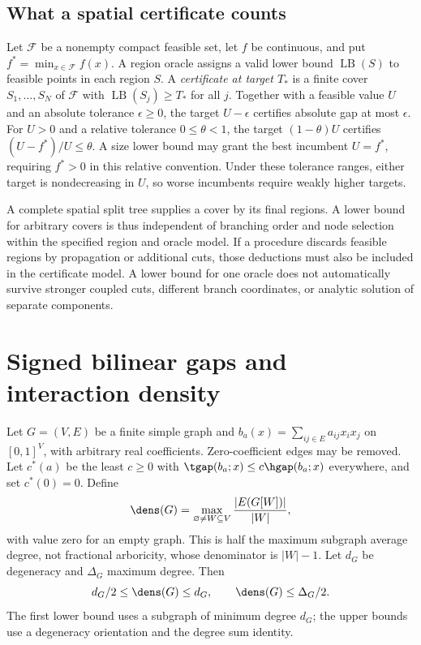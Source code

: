 \subsection{What a spatial certificate counts}\label{subsec:certificate-model}
Let $\mathcal F$ be a nonempty compact feasible set, let $f$ be continuous,
and put $f^*=\min_{x\in\mathcal F}f(x)$. A region oracle assigns a valid
lower bound $\operatorname{LB}(S)$ to feasible points in each region $S$.
A \emph{certificate at target $T_*$} is a finite cover $S_1,\ldots,S_N$
of $\mathcal F$ with $\operatorname{LB}(S_j)\ge T_*$ for all $j$.
Together with a feasible value $U$ and an absolute tolerance $\epsilon\ge0$,
the target $U-\epsilon$ certifies absolute gap at most $\epsilon$.
For $U>0$ and a relative tolerance $0\le\theta<1$, the target
$(1-\theta)U$ certifies $(U-f^*)/U\le\theta$. A size lower bound may
grant the best incumbent $U=f^*$, requiring $f^*>0$ in this relative
convention. Under these tolerance ranges, either target is nondecreasing
in $U$, so worse incumbents require weakly higher targets.

A complete spatial split tree supplies a cover by its final regions.
A lower bound for arbitrary covers is thus independent of branching order
and node selection within the specified region and oracle model. If a
procedure discards feasible regions by propagation or additional cuts,
those deductions must also be included in the certificate model. A lower
bound for one oracle does not automatically survive stronger coupled cuts,
different branch coordinates, or analytic solution of separate components.

\section{Signed bilinear gaps and interaction density}\label{sec:bilinear}
Let $G=(V,E)$ be a finite simple graph and
$b_a(x)=\sum_{ij\in E}a_{ij}x_ix_j$ on $[0,1]^V$, with arbitrary real
coefficients. Zero-coefficient edges may be removed. Let $c^*(a)$ be the
least $c\ge0$ with $\tgap(b_a;x)\le c\hgap(b_a;x)$ everywhere, and set
$c^*(0)=0$. Define
\begin{equation}\label{eq:density-definition}
 \dens(G)=\max_{\varnothing\ne W\subseteq V}\frac{|E(G[W])|}{|W|},
\end{equation}
with value zero for an empty graph. This is half the maximum subgraph
average degree, not fractional arboricity, whose denominator is $|W|-1$.
Let $d_G$ be degeneracy and $\Delta_G$ maximum degree. Then
\begin{equation}\label{eq:density-comparisons}
 d_G/2\le\dens(G)\le d_G,\qquad \dens(G)\le\Delta_G/2.
\end{equation}
The first lower bound uses a subgraph of minimum degree $d_G$; the upper
bounds use a degeneracy orientation and the degree sum identity.

